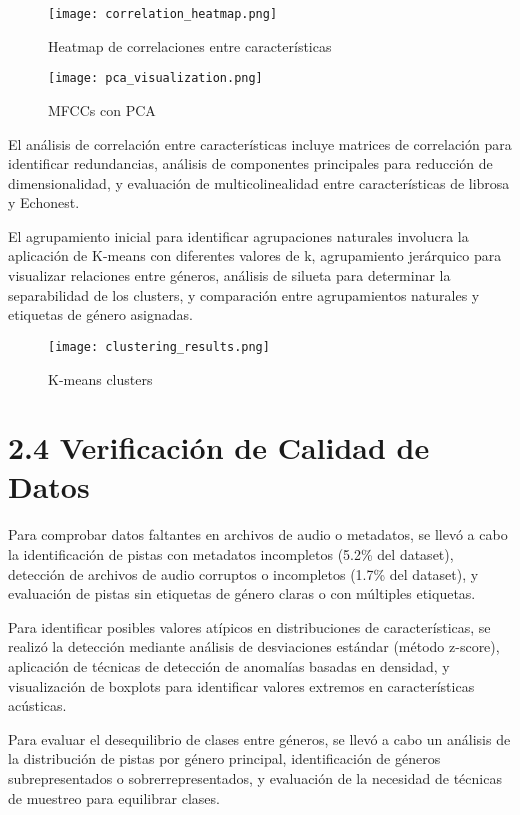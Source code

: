 \documentclass{article}
\begin{document}
\begin{figure}[H]
    \centering
    \texttt{[image: correlation\_heatmap.png]}
    \caption{Heatmap de correlaciones entre características}
    \label{fig:enter-label}
\end{figure}

\begin{figure}[H]
    \centering
    \texttt{[image: pca\_visualization.png]}
    \caption{MFCCs con PCA}
    \label{fig:enter-label}
\end{figure}

El análisis de correlación entre características incluye matrices de correlación para identificar redundancias, análisis de componentes principales para reducción de dimensionalidad, y evaluación de multicolinealidad entre características de librosa y Echonest.

El agrupamiento inicial para identificar agrupaciones naturales involucra la aplicación de K-means con diferentes valores de k, agrupamiento jerárquico para visualizar relaciones entre géneros, análisis de silueta para determinar la separabilidad de los clusters, y comparación entre agrupamientos naturales y etiquetas de género asignadas.

\begin{figure}[H]
    \centering
    \texttt{[image: clustering\_results.png]}
    \caption{K-means clusters}
    \label{fig:enter-label}
\end{figure}

\section*{2.4 Verificación de Calidad de Datos}
Para comprobar datos faltantes en archivos de audio o metadatos, se llevó a cabo la identificación de pistas con metadatos incompletos (5.2\% del dataset), detección de archivos de audio corruptos o incompletos (1.7\% del dataset), y evaluación de pistas sin etiquetas de género claras o con múltiples etiquetas.

Para identificar posibles valores atípicos en distribuciones de características, se realizó la detección mediante análisis de desviaciones estándar (método z-score), aplicación de técnicas de detección de anomalías basadas en densidad, y visualización de boxplots para identificar valores extremos en características acústicas.

Para evaluar el desequilibrio de clases entre géneros, se llevó a cabo un análisis de la distribución de pistas por género principal, identificación de géneros subrepresentados o sobrerrepresentados, y evaluación de la necesidad de técnicas de muestreo para equilibrar clases.
\end{document}

